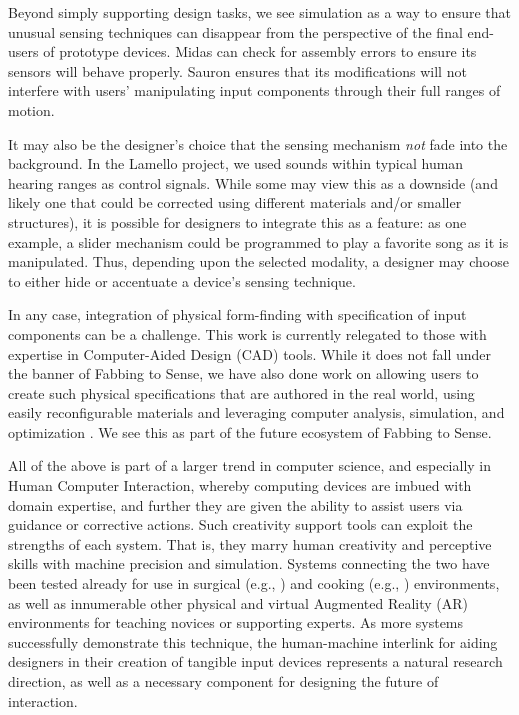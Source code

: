 Beyond simply supporting design tasks, we see simulation as a way to ensure that unusual sensing techniques can disappear from the perspective of the final end-users of prototype devices. Midas can check for assembly errors to ensure its sensors will behave properly. Sauron ensures that its modifications will not interfere with users' manipulating input components through their full ranges of motion.

It may also be the designer's choice that the sensing mechanism \emph{not} fade into the background. In the Lamello project, we used sounds within typical human hearing ranges as control signals. While some may view this as a downside (and likely one that could be corrected using different materials and/or smaller structures), it is possible for designers to integrate this as a feature: as one example, a slider mechanism could be programmed to play a favorite song as it is manipulated. Thus, depending upon the selected modality, a designer may choose to either hide or accentuate a device's sensing technique.

In any case, integration of physical form-finding with specification of input components can be a challenge. This work is currently relegated to those with expertise in Computer-Aided Design (CAD) tools. While it does not fall under the banner of Fabbing to Sense, we have also done work on allowing users to create such physical specifications that are authored in the real world, using easily reconfigurable materials and leveraging computer analysis, simulation, and optimization \cite{savage-mmarks}. We see this as part of the future ecosystem of Fabbing to Sense.

All of the above is part of a larger trend in computer science, and especially in Human Computer Interaction, whereby computing devices are imbued with domain expertise, and further they are given the ability to assist users via guidance or corrective actions. Such creativity support tools can exploit the strengths of each system. That is, they marry human creativity and perceptive skills with machine precision and simulation. Systems connecting the two have been tested already for use in surgical (e.g., \cite{kahol-surgical}) and cooking (e.g., \cite{sato-mimicook}) environments, as well as innumerable other physical and virtual Augmented Reality (AR) environments for teaching novices or supporting experts. As more systems successfully demonstrate this technique, the human-machine interlink for aiding designers in their creation of tangible input devices represents a natural research direction, as well as a necessary component for designing the future of interaction.

